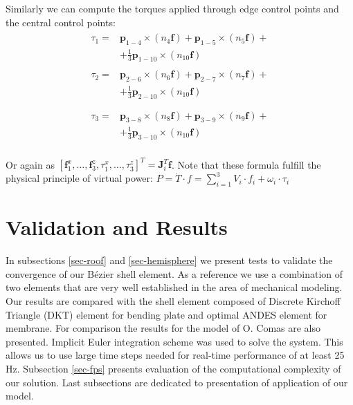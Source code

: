 \documentclass{egpubl}
\begin{document}
Similarly we can compute the torques applied through edge control points and
the central control points:
%
\begin{gather}
    \begin{split}
        \tau_1 = & \mathbf{p}_{1-4} \times (n_4 \mathbf{f}) + \mathbf{p}_{1-5} \times (n_5 \mathbf{f}) + \\
                 & + \frac{1}{3} \mathbf{p}_{1-10} \times (n_{10} \mathbf{f})
    \end{split}
    \\
    \begin{split}
        \tau_2 = & \mathbf{p}_{2-6} \times (n_6 \mathbf{f}) + \mathbf{p}_{2-7} \times (n_7 \mathbf{f}) + \\
                 & + \frac{1}{3} \mathbf{p}_{2-10} \times (n_{10} \mathbf{f}) \\
    \end{split}
    \\
    \begin{split}
        \tau_3 = & \mathbf{p}_{3-8} \times (n_8 \mathbf{f}) + \mathbf{p}_{3-9} \times (n_9 \mathbf{f}) + \\
                 & + \frac{1}{3} \mathbf{p}_{3-10} \times (n_{10} \mathbf{f}) \\
    \end{split}
\end{gather}

Or again as
%
$
\left[ \mathbf{f}^x_1, \hdots, \mathbf{f}^z_3, \tau^x_1, \hdots, \tau^z_3 \right]^T =
\mathbf{J}^T_i \mathbf{f}
$.
%
Note that these formula fulfill the physical principle of virtual power: $ P = \dot{T} \cdot f  = \sum_{i=1}^3 V_i \cdot f_i +  \omega_i  \cdot \tau_i$



\section{Validation and Results} %


In subsections \ref{sec-roof} and \ref{sec-hemisphere} we present tests to
validate the convergence of our B\'ezier shell element. As a reference we use a
combination of two elements that are very well established in the area of
mechanical modeling. Our results are compared with the shell element composed
of Discrete Kirchoff Triangle (DKT) element \cite{Batoz1980} for bending plate
and optimal ANDES element \cite{Felippa2003} for membrane. For comparison the
results for the model of O. Comas \cite{Comas2010c} are also presented. 
Implicit Euler integration scheme was used to solve the system. This allows us
to use large time steps needed for real-time performance of at least 25 Hz.
Subsection \ref{sec-fps}
presents evaluation of the computational complexity of our solution. Last
subsections are dedicated to presentation of application of our model.
\end{document}
